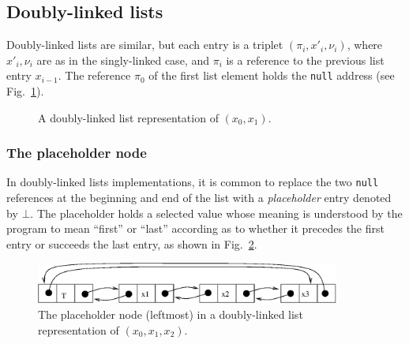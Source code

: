 \documentclass[a4paper]{book}
\theoremstyle{changebreak}                %
\begin{document}
\subsection{Doubly-linked lists}
Doubly-linked lists are similar, but each
entry is a triplet $(\pi_i,x'_i,\nu_i)$, where $x'_i,\nu_i$ are as in
the singly-linked case, and $\pi_i$ is a reference to the
previous list entry $x_{i-1}$. The reference
$\pi_0$ of the first list element holds the {\tt null} address  (see
Fig.~\ref{f:doublylinked}).
\begin{figure}[!ht]
\begin{center}
\end{center}
\caption{A doubly-linked list representation of $(x_0,x_1)$.}
\label{f:doublylinked}
\end{figure}

\subsubsection{The placeholder node}
In doubly-linked lists implementations, it is common to replace the
two {\tt null} references at the beginning and end of the list with a
{\it placeholder} entry
denoted by $\bot$. The placeholder holds a selected value whose
meaning is understood by the program to mean ``first'' or ``last''
according as to whether it precedes the first entry or succeeds the
last entry, as shown in Fig.~\ref{f:dllist}.
\begin{figure}[!ht]
\begin{center}
\includegraphics[width=10cm]{dllist}
\end{center}
\caption{The placeholder node (leftmost) in a doubly-linked list
  representation of $(x_0,x_1,x_2)$.}
\label{f:dllist}
\end{figure}
\end{document}
